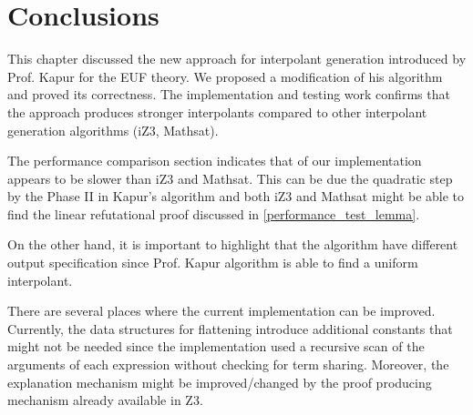 \section{Conclusions}

This chapter discussed the new approach
for interpolant generation introduced by
Prof. Kapur for the EUF theory. We 
proposed a modification of his algorithm
and proved its correctness. The 
implementation and testing work confirms 
that the approach produces stronger interpolants
compared to other interpolant generation
algorithms (iZ3, Mathsat).

The performance comparison section indicates
that of our implementation appears to be slower 
than iZ3 and Mathsat.
This can be due the quadratic step 
by the Phase II in Kapur's algorithm
and both iZ3 and Mathsat might be able
to find the linear refutational proof 
discussed in \ref{performance_test_lemma}.

On the other hand, it is important to 
highlight that the algorithm have different
output specification since Prof. Kapur algorithm
is able to find a uniform interpolant.

There are several places
where the current implementation can be
improved. Currently, the data structures
for flattening introduce additional constants
that might not be needed since the implementation
used a recursive scan of the arguments of each
expression without checking for term sharing.
Moreover, the explanation mechanism might be
improved/changed by the proof producing mechanism
already available in Z3. 


